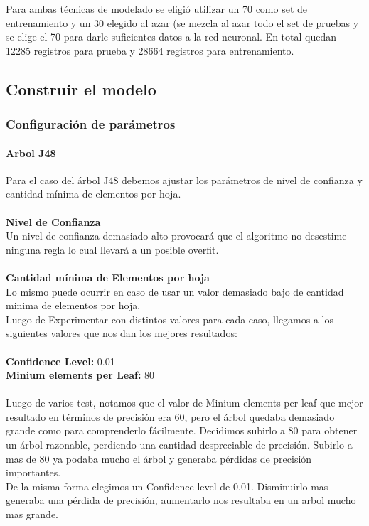       Para ambas técnicas de modelado se eligió utilizar un 70%
      como set de entrenamiento y un 30%
      elegido al azar (se mezcla al azar todo el set de pruebas y se elige el
      70%
      para darle suficientes datos a la red neuronal. En total quedan 12285
      registros para prueba y 28664 registros para entrenamiento.


\subsection{Construir el modelo}
    \subsubsection{Configuración de parámetros}

      \paragraph{Arbol J48}
          Para el caso del árbol J48 debemos ajustar los parámetros de nivel de
          confianza y cantidad mínima de elementos por hoja.\\\\
          \textbf{Nivel de Confianza\\}
          Un nivel de confianza demasiado alto provocará que el algoritmo no
          desestime ninguna regla lo cual llevará a un posible overfit.\\\\
          \textbf{Cantidad mínima de Elementos por hoja\\}
          Lo mismo puede ocurrir en caso de usar un valor demasiado bajo de
          cantidad minima de elementos por hoja.\\
          Luego de Experimentar con distintos valores para cada caso, llegamos a
          los siguientes valores que nos dan los mejores resultados:\\\\
          \textbf{Confidence Level:} 0.01\\
          \textbf{Minium elements per Leaf:} 80\\\\

          Luego de varios test, notamos que el valor de Minium elements per leaf
          que mejor resultado en términos de precisión era 60, pero el árbol
          quedaba demasiado grande como para comprenderlo fácilmente. Decidimos
          subirlo a 80 para obtener un árbol razonable, perdiendo una cantidad
          despreciable de precisión. Subirlo a mas de 80 ya podaba mucho el
          árbol y generaba pérdidas de precisión importantes.\\
          De la misma forma elegimos un Confidence level de 0.01. Disminuirlo
          mas generaba una pérdida de precisión, aumentarlo nos resultaba en un
          arbol mucho mas grande.

